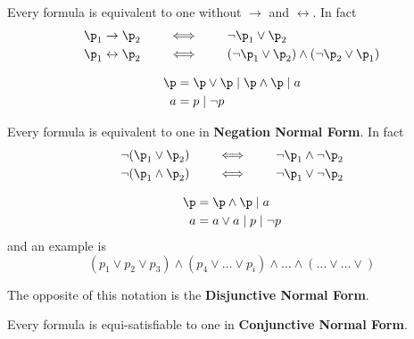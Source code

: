 \documentclass[oneside]{academica}
\begin{document}
\begin{lemma*}
  Every formula is equivalent to one without $\to$ and $\leftrightarrow$. In fact
  \begin{align*}
    \p_1 \to \p_2 \qquad &\iff \qquad \neg \p_1 \lor \p_2 \\
    \p_1 \leftrightarrow \p_2 \qquad &\iff \qquad (\neg \p_1 \lor \p_2) \land (\neg \p_2 \lor \p_1)
  \end{align*}
\end{lemma*}

\begin{definition*}
  \vspace{-15pt}
  \begin{align*}
    \p &= \p \lor \p \mid \p \land \p \mid a \\
    a &= p \mid \neg p
  \end{align*}
\end{definition*}

\begin{lemma*}
  Every formula is equivalent to one in \textbf{Negation Normal Form}. In fact
  \begin{align*}
    \neg(\p_1 \lor \p_2) \qquad &\iff \qquad \neg \p_1 \land \neg \p_2\\
    \neg(\p_1 \land \p_2) \qquad &\iff \qquad \neg \p_1 \lor \neg \p_2
  \end{align*}
\end{lemma*}

\begin{definition*}
  \vspace{-15pt}
  \begin{align*}
    \p &= \p \land \p \mid a \\
    a &= a \lor a \mid p \mid \neg p
  \end{align*}
  and an example is
  \begin{equation*}
    (p_1 \lor p_2 \lor p_3) \land (p_4 \lor \ldots \lor p_i) \land \ldots \land (\ldots \lor \ldots \lor) 
  \end{equation*}

  The opposite of this notation is the \textbf{Disjunctive Normal Form}.
\end{definition*}

\begin{corollary}[Tseitin]\label{thm:tseitin}
  Every formula is equi-satisfiable to one in \textbf{Conjunctive Normal Form}.
\end{corollary}
\end{document}
